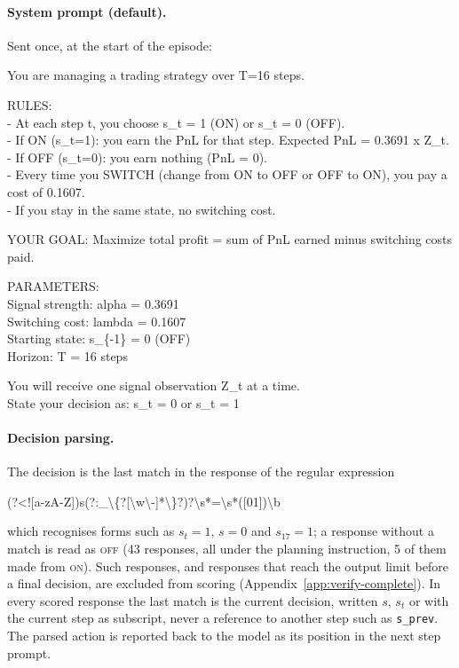 \documentclass[10pt,a4paper,twocolumn]{article}
\newcommand{\ON}{\textsc{on}}
\newcommand{\OFF}{\textsc{off}}
\begin{document}
\paragraph{System prompt (default).} Sent once, at the start of the episode:
\begin{cotbox}
You are managing a trading strategy over T=16 steps.

RULES:\\
- At each step t, you choose s\_t = 1 (ON) or s\_t = 0 (OFF).\\
- If ON (s\_t=1): you earn the PnL for that step. Expected PnL = 0.3691 x Z\_t.\\
- If OFF (s\_t=0): you earn nothing (PnL = 0).\\
- Every time you SWITCH (change from ON to OFF or OFF to ON), you pay a cost of 0.1607.\\
- If you stay in the same state, no switching cost.

YOUR GOAL: Maximize total profit = sum of PnL earned minus switching costs paid.

PARAMETERS:\\
  Signal strength: alpha = 0.3691\\
  Switching cost:  lambda = 0.1607\\
  Starting state:  s\_\{-1\} = 0 (OFF)\\
  Horizon:         T = 16 steps

You will receive one signal observation Z\_t at a time.\\
State your decision as: s\_t = 0 or s\_t = 1
\end{cotbox}

\paragraph{Decision parsing.} The decision is the last match in the response of the regular expression
\begin{cotbox}
\footnotesize (?<![a-zA-Z])s(?:\_\textbackslash\{?[\textbackslash w\textbackslash -]*\textbackslash\}?)?\textbackslash s*=\textbackslash s*([01])\textbackslash b
\end{cotbox}
which recognises forms such as $s_t=1$, $s=0$ and $s_{17}=1$; a response without a match is read as \OFF{} (43 responses, all under the planning instruction, 5 of them made from \ON{}). Such responses, and responses that reach the output limit before a final decision, are excluded from scoring (Appendix~\ref{app:verify-complete}). In every scored response the last match is the current decision, written $s$, $s_t$ or with the current step as subscript, never a reference to another step such as \texttt{s\_prev}. The parsed action is reported back to the model as its position in the next step prompt.
\end{document}
